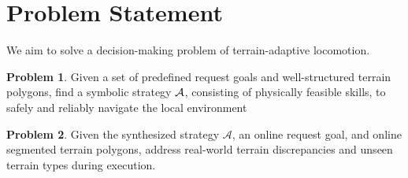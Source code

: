 \documentclass[letterpaper, 10 pt, conference]{ieeeconf}
\begin{document}


\section{Problem Statement}\label{sec:problem_statement}
We aim to solve a decision-making problem of terrain-adaptive locomotion.


\textbf{Problem 1}.
Given a set of predefined request goals and well-structured terrain polygons, 
find a symbolic strategy ${\mathcal A}$, consisting of physically feasible skills, to safely and reliably navigate the local environment

\textbf{Problem 2}.
Given the synthesized strategy $\mathcal{A}$, an online request goal, and online segmented terrain polygons, 
address 
real-world terrain discrepancies and unseen terrain types during execution.

\end{document}
